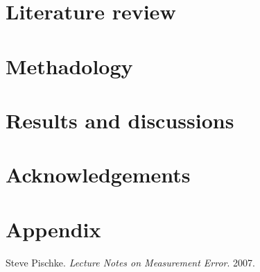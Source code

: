 \documentclass{article}
\begin{document}
\section{Literature review}

\section{Methadology}

\section{Results and discussions}

\section{Acknowledgements}

\section{Appendix}

\begin{thebibliography}{9}

    Steve Pischke.
    \textit{Lecture Notes on Measurement Error}.
    2007.
\end{thebibliography}
\end{document}
